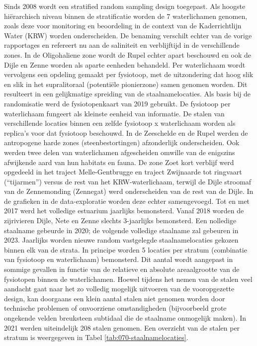 \documentclass[twoside]{extreport}
\begin{document}
Sinds 2008 wordt een stratified random sampling design toegepast. Als
hoogste hiërarchisch niveau binnen de stratificatie worden de 7
waterlichamen genomen, zoals deze voor monitoring en beoordeling in de
context van de Kaderrichtlijn Water (KRW) worden onderscheiden. De
benaming verschilt echter van de vorige rapportages en refereert nu aan
de saliniteit en verblijftijd in de verschillende zones. In de
Oligohaliene zone wordt de Rupel echter apart beschouwd en ook de Dijle
en Zenne worden als aparte eenheden behandeld. Per waterlichaam wordt
vervolgens een opdeling gemaakt per fysiotoop, met de uitzondering dat
hoog slik en slik in het supralitoraal (potentiële pionierzone) samen
genomen worden. Dit resulteert in een gelijkmatige spreiding van de
staalnamelocaties. Als basis bij de randomisatie werd de fysiotopenkaart
van 2019 gebruikt. De fysiotoop per waterlichaam fungeert als kleinste
eenheid van informatie. De stalen van verschillende locaties binnen een
zelfde fysiotoop x waterlichaam worden als replica's voor dat fysiotoop
beschouwd. In de Zeeschelde en de Rupel werden de antropogene harde
zones (steenbestortingen) afzonderlijk onderscheiden. Ook werden twee
delen van waterlichamen afgescheiden omwille van de enigszins afwijkende
aard van hun habitats en fauna. De zone Zoet kort verblijf werd
opgedeeld in het traject Melle-Gentbrugge en traject Zwijnaarde tot
ringvaart (``tijarmen'') versus de rest van het KRW-waterlichaam,
terwijl de Dijle stroomaf van de Zennemonding (Zennegat) werd
onderscheiden van de rest van de Dijle. In de grafieken in de
data-exploratie worden deze echter samengevoegd. Tot en met 2017 werd
het volledige estuarium jaarlijks bemonsterd. Vanaf 2018 worden de
zijrivieren Dijle, Nete en Zenne slechts 3-jaarlijks bemonsterd. Een
nolledige staalname gebeurde in 2020; de volgende volledige staalname
zal gebeuren in 2023. Jaarlijks worden nieuwe random vastgelegde
staalnamelocaties gekozen binnen elk van de strata. In principe worden 5
locaties per stratum (combinatie van fysiotoop en waterlichaam)
bemonsterd. Dit aantal wordt aangepast in sommige gevallen in functie
van de relatieve en absolute areaalgrootte van de fysiotopen binnen de
waterlichamen. Hoewel tijdens het nemen van de stalen veel aandacht gaat
naar het zo volledig mogelijk uitvoeren van de vooropgezette design, kan
doorgaans een klein aantal stalen niet genomen worden door technische
problemen of onvoorziene omstandigheden (bijvoorbeeld grote ongekende
velden breuksteen subtidaal die de staalname onmogelijk maken). In 2021
werden uiteindelijk 208 stalen genomen. Een overzicht van de stalen per
stratum is weergegeven in Tabel \ref{tab:070-staalnamelocaties}.
\end{document}
